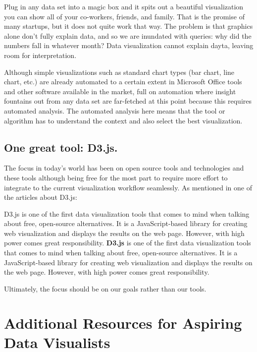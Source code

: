 \documentclass[]{book}
\begin{document}
Plug in any data set into a magic box and it spits out a beautiful visualization you can show all of your co-workers, friends, and family. That is the promise of many startups, but it does not quite work that way. The problem is that graphics alone don't fully explain data, and so we are inundated with queries: why did the numbers fall in whatever month? Data visualization cannot explain dayta, leaving room for interpretation.

Although simple visualizations such as standard chart types (bar chart, line chart, etc.) are already automated to a certain extent in Microsoft Office tools and other software available in the market, full on automation where insight fountains out from any data set are far-fetched at this point because this requires automated analysis. The automated analysis here means that the tool or algorithm has to understand the context and also select the best visualization.

\hypertarget{one-great-tool-d3.js.}{%
\subsection{One great tool: D3.js.}\label{one-great-tool-d3.js.}}

The focus in today's world has been on open source tools and technologies and these tools although being free for the most part to require more effort to integrate to the current visualization workflow seamlessly. As mentioned in one of the articles about D3.js:

D3.js is one of the first data visualization tools that comes to mind when talking about free, open-source alternatives. It is a JavaScript-based library for creating web visualization and displays the results on the web page. However, with high power comes great responsibility.
\textbf{D3.js} is one of the first data visualization tools that comes to mind when talking about free, open-source alternatives. It is a JavaScript-based library for creating web visualization and displays the results on the web page. However, with high power comes great responsibility.

Ultimately, the focus should be on our goals rather than our tools.

\hypertarget{additional-resources-for-aspiring-data-visualists}{%
\section{Additional Resources for Aspiring Data Visualists}\label{additional-resources-for-aspiring-data-visualists}}
\end{document}
